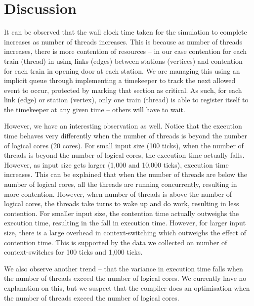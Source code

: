 \documentclass[a4paper,12pt]{article}
\begin{document}
	\section{Discussion}
	It can be observed that the wall clock time taken for the simulation to complete increases as number of threads increases. This is because as number of threads increases, there is more contention of resources -- in our case contention for each train (thread) in using links (edges) between stations (vertices) and contention for each train in opening door at each station. We are managing this using an implicit queue through implementing a timekeeper to track the next allowed event to occur, protected by marking that section as critical. As such, for each link (edge) or station (vertex), only one train (thread) is able to register itself to the timekeeper at any given time -- others will have to wait.
	
	However, we have an interesting observation as well. Notice that the execution time behaves very differently when the number of threads is beyond the number of logical cores (20 cores). For small input size (100 ticks), when the number of threads is beyond the number of logical cores, the execution time actually falls. However, as input size gets larger (1,000 and 10,000 ticks), execution time increases. This can be explained that when the number of threads are below the number of logical cores, all the threads are running concurrently, resulting in more contention. However, when number of threads is above the number of logical cores, the threads take turns to wake up and do work, resulting in less contention. For smaller input size, the contention time actually outweighs the execution time, resulting in the fall in execution time. However, for larger input size, there is a large overhead in context-switching which outweighs the effect of contention time. This is supported by the data we collected on number of context-switches for 100 ticks and 1,000 ticks.
	
	We also observe another trend -- that the variance in execution time falls when the number of threads exceed the number of logical cores. We currently have no explanation on this, but we suspect that the compiler does an optimisation when the number of threads exceed the number of logical cores.
	
\end{document}
